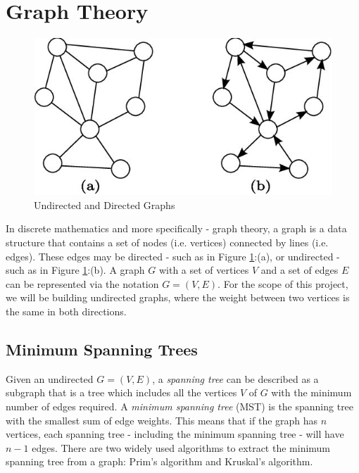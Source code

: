 \documentclass[paper=a4,fontsize=11pt]{report}	%
\begin{document}
\section{Graph Theory}
\begin{figure}[H]
\centering
\includegraphics[scale=1.5]{graph-example}
\caption{Undirected and Directed Graphs}
\label{fig:graph.example}
\end{figure}
In discrete mathematics and more specifically - graph theory, a graph is a data structure that contains a set of nodes (i.e. vertices) connected by lines (i.e. edges).  These edges may be directed - such as in Figure \ref{fig:graph.example}:(a), or undirected - such as in Figure \ref{fig:graph.example}:(b). A graph $G$ with a set of vertices $V$ and a set of edges $E$ can be represented via the notation $G = (V,E)$. For the scope of this project,  we will be building undirected graphs, where the weight between two vertices is the same in both directions.

\subsection{Minimum Spanning Trees}
Given an undirected $G = (V,E)$,  a \textit{spanning tree} can be described as a subgraph that is a tree which includes all the vertices $V$ of $G$ with the minimum number of edges required. A \textit{minimum spanning tree} (MST) is the spanning tree with the smallest sum of edge weights.  This means that if the graph has $n$ vertices, each spanning tree - including the minimum spanning tree - will have $n-1$ edges. There are two widely used algorithms to extract the minimum spanning tree from a graph: Prim's algorithm and Kruskal's algorithm.
\end{document}
